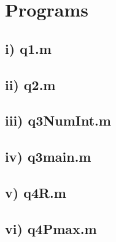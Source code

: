 \documentclass[10pt]{article}
\begin{document}
\newpage
\section*{Programs}
\subsection*{i) q1.m}

\vspace{2.0cm}
\subsection*{ii) q2.m}

\newpage
\subsection*{iii) q3\textunderscore NumInt.m}

\vspace{2.0cm}
\subsection*{iv) q3\textunderscore main.m}

\newpage
\subsection*{v) q4\textunderscore R.m}

\vspace{2.0cm}
\subsection*{vi) q4\textunderscore Pmax.m}

\end{document}

